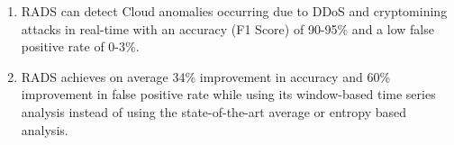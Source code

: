 \begin{enumerate}[{(a)}]
\item RADS can detect Cloud anomalies occurring due to DDoS and cryptomining attacks in real-time with an accuracy (F1 Score) of 90-95\% and a low false positive rate of 0-3\%.
\item RADS achieves on average 34\% improvement in accuracy and 60\% improvement in false positive rate while using its window-based time series analysis instead of using the state-of-the-art average or entropy based analysis. 
\end{enumerate}


